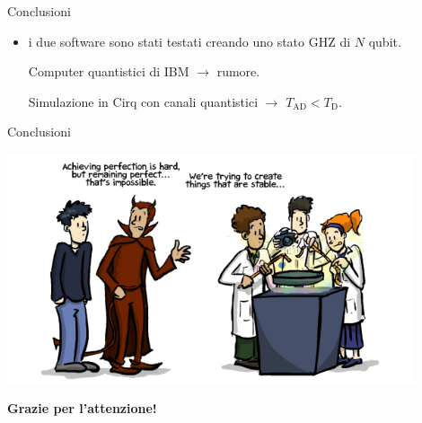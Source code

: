 \documentclass{beamer}
\renewcommand{\'}[0]{\`}
\begin{document}
\begin{frame}{Conclusioni}
\begin{itemize}
	\item  i due software sono stati testati creando uno stato GHZ di $N$ qubit. 	\pause
		\vspace{0.05cm}	
		
		Computer quantistici di IBM $\rightarrow$ rumore. 		

		Simulazione in Cirq con canali quantistici 	$\rightarrow$ $T_{\text{AD}} < T_{\text{D}}$. 
	\end{itemize}
	

		

	\end{frame}
	
\begin{frame}{Conclusioni}\

	\centering \includegraphics[width=0.9\textwidth]{./image/vignetta.png} \pause
		
%			
	\centering \huge \textbf{Grazie per l'attenzione! }
\end{frame}
	
\end{document}
